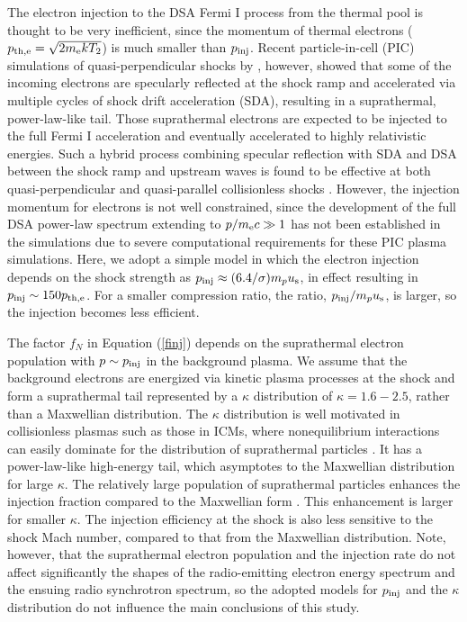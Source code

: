 \documentclass[twocolumn]{aastex61}
\begin{document}
The electron injection to the DSA Fermi I process from the thermal pool is thought to be very inefficient, 
since the momentum of thermal electrons ($p_{\rm th,e}=\sqrt{2m_{\rm e} k T_2}$) is much smaller than $p_{\rm inj}$. 
Recent particle-in-cell (PIC) simulations of quasi-perpendicular shocks by \citet{guo14}, however, showed that some of the incoming 
electrons are specularly reflected at the shock ramp and accelerated via multiple cycles of shock drift acceleration (SDA), 
resulting in a suprathermal, power-law-like tail.
Those suprathermal electrons are expected to be injected to the full Fermi I acceleration and eventually accelerated 
to highly relativistic energies.
Such a hybrid process combining specular reflection with SDA and DSA between the shock ramp and upstream waves 
is found to be effective at both quasi-perpendicular and quasi-parallel collisionless shocks \citep{park15,sundberg16}.
However, the injection momentum for electrons is not well constrained,
since the development of the full DSA power-law spectrum extending to $p/m_{\rm e}c\gg 1$ has not been established in the simulations due to severe
computational requirements for these PIC plasma simulations.
Here, we adopt a simple model in which the electron injection depends on the shock strength as
$p_{\rm inj}\approx (6.4/\sigma) m_p u_{\rm s}$, in effect resulting in $p_{\rm inj}\sim 150 p_{\rm th,e}$.
For a smaller compression ratio, the ratio, $p_{\rm inj}/m_p u_{\rm s}$, is larger, so the injection becomes less efficient.

The factor $f_N$ in Equation (\ref{finj}) depends on the suprathermal electron population with $p\sim p_{\rm inj}$ in the background plasma.
We assume that the background electrons are energized via kinetic plasma processes at the shock and
form a suprathermal tail represented by a $\kappa$ distribution of $\kappa=1.6-2.5$,
rather than a Maxwellian distribution.
The $\kappa$ distribution is well motivated in collisionless plasmas such as those in ICMs, 
where nonequilibrium interactions can easily dominate for the distribution of suprathermal particles \citep{pierrard10}. 
It has a power-law-like high-energy tail, which asymptotes to the Maxwellian distribution for large $\kappa$.
The relatively large population of suprathermal particles enhances the injection fraction compared to the Maxwellian form \citep{kang14}. 
This enhancement is larger for smaller $\kappa$. 
The injection efficiency at the shock is also less sensitive to the shock Mach number, compared to that from the Maxwellian distribution.
Note, however, that the suprathermal electron population and the injection rate do not affect significantly
the shapes of the radio-emitting electron energy spectrum and the ensuing radio synchrotron spectrum,
so the adopted models for $p_{\rm inj}$ and the $\kappa$ distribution do not influence the main conclusions of this study.
\end{document}
